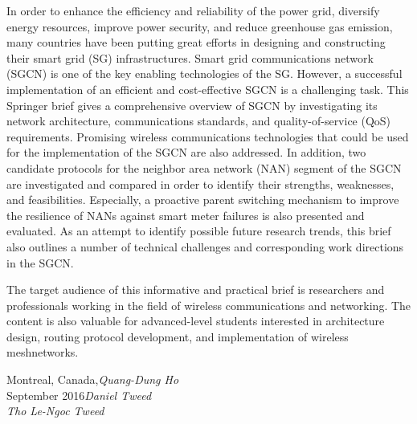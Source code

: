 %
%

\preface

In order to enhance the efficiency and reliability of the power grid, diversify energy resources, improve power security, and reduce greenhouse gas emission, many countries have been putting great efforts in designing and constructing their smart grid (SG) infrastructures. Smart grid communications network (SGCN) is one of the key enabling technologies of the SG. However, a successful implementation of an efficient and cost-effective SGCN is a challenging task. This Springer brief gives a comprehensive overview of SGCN by investigating its network architecture, communications standards, and quality-of-service (QoS) requirements. Promising wireless communications technologies that could be used for the implementation of the SGCN are also addressed. In addition, two candidate protocols for the neighbor area network (NAN) segment of the SGCN are investigated and compared in order to identify their strengths, weaknesses, and feasibilities. Especially, a proactive parent switching mechanism to improve the resilience of NANs against smart meter failures is also presented and evaluated. As an attempt to identify possible future research trends, this brief also outlines a number of technical challenges and corresponding work directions in the SGCN.

The target audience of this informative and practical brief is researchers and professionals working in the field of wireless communications and networking. The content is also valuable for advanced-level students interested in architecture design, routing protocol development, and implementation of wireless meshnetworks.

\vspace{\baselineskip}
\begin{flushright}\noindent
Montreal, Canada,\hfill {\it Quang-Dung Ho}\\
September 2016\hfill {\it Daniel Tweed}\\
\hfill {\it Tho Le-Ngoc Tweed}\\
\end{flushright}